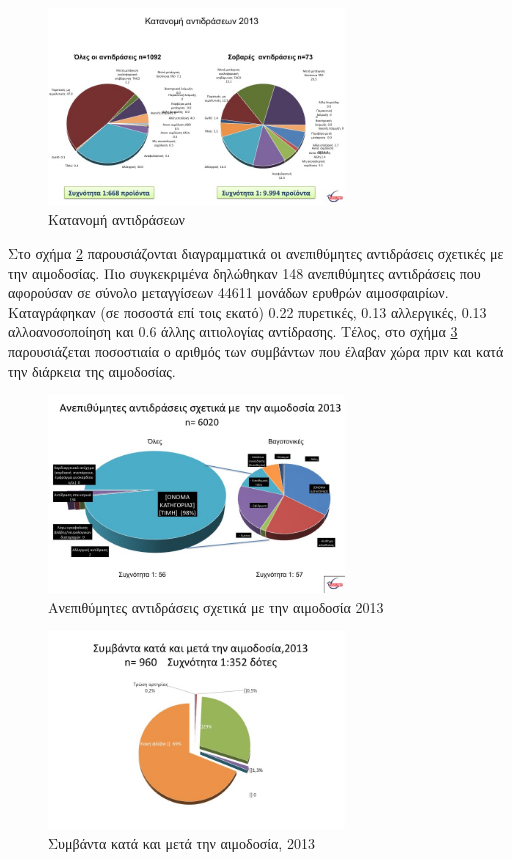 \begin{figure}[h!]
	    \centering
	    \includegraphics[width=0.7\textwidth]{statistics3.jpg}
	    \caption{Κατανομή αντιδράσεων}
	    \label{fig:statistics3}
\end{figure}
Στο σχήμα \ref{fig:statistics4} παρουσιάζονται διαγραμματικά οι ανεπιθύμητες αντιδράσεις σχετικές  με την αιμοδοσίας. Πιο συγκεκριμένα δηλώθηκαν 148 ανεπιθύμητες αντιδράσεις που αφορούσαν σε σύνολο μεταγγίσεων 44611 μονάδων ερυθρών αιμοσφαιρίων. Καταγράφηκαν (σε ποσοστά επί τοις εκατό) 0.22 πυρετικές, 0.13 αλλεργικές, 0.13 αλλοανοσοποίηση και 0.6 άλλης αιτιολογίας αντίδρασης. Τέλος, στο σχήμα \ref{fig:statistics5} παρουσιάζεται ποσοστιαία ο αριθμός των συμβάντων που  έλαβαν χώρα πριν και κατά την διάρκεια της αιμοδοσίας.
\begin{figure}[h!]
	    \centering
	    \includegraphics[width=0.7\textwidth]{statistics4.jpg}
	    \caption{Ανεπιθύμητες αντιδράσεις σχετικά με την αιμοδοσία 2013}
	    \label{fig:statistics4}
\end{figure}
\begin{figure}[h!]
	    \centering
	    \includegraphics[width=0.7\textwidth]{statistics5.jpg}
	    \caption{ Συμβάντα κατά και μετά την αιμοδοσία, 2013}
	    \label{fig:statistics5}
\end{figure}
